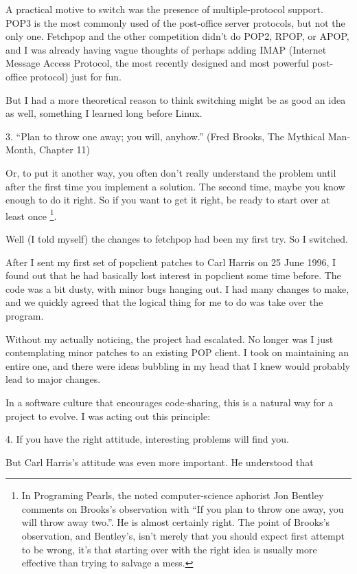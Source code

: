 \documentclass[a4paper,12pt,UTF8,twoside]{ctexbook}
\begin{document}
A practical motive to switch was the presence of multiple-protocol support. POP3 is the most commonly used of the post-office server protocols, but not the only one. Fetchpop and the other competition didn't do POP2, RPOP, or APOP, and I was already having vague thoughts of perhaps adding IMAP (Internet Message Access Protocol, the most recently designed and most powerful post-office protocol) just for fun.

But I had a more theoretical reason to think switching might be as good an idea as well, something I learned long before Linux.

3. ``Plan to throw one away; you will, anyhow.'' (Fred Brooks, The Mythical Man-Month, Chapter 11)

Or, to put it another way, you often don't really understand the problem until after the first time you implement a solution. The second time, maybe you know enough to do it right. So if you want to get it right, be ready to start over at least once \footnote{In Programing Pearls, the noted computer-science aphorist Jon Bentley comments on Brooks's observation with ``If you plan to throw one away, you will throw away two.''. He is almost certainly right. The point of Brooks's observation, and Bentley's, isn't merely that you should expect first attempt to be wrong, it's that starting over with the right idea is usually more effective than trying to salvage a mess.}.

Well (I told myself) the changes to fetchpop had been my first try. So I switched.

After I sent my first set of popclient patches to Carl Harris on 25 June 1996, I found out that he had basically lost interest in popclient some time before. The code was a bit dusty, with minor bugs hanging out. I had many changes to make, and we quickly agreed that the logical thing for me to do was take over the program.

Without my actually noticing, the project had escalated. No longer was I just contemplating minor patches to an existing POP client. I took on maintaining an entire one, and there were ideas bubbling in my head that I knew would probably lead to major changes.

In a software culture that encourages code-sharing, this is a natural way for a project to evolve. I was acting out this principle:

4. If you have the right attitude, interesting problems will find you.

But Carl Harris's attitude was even more important. He understood that
\end{document}

